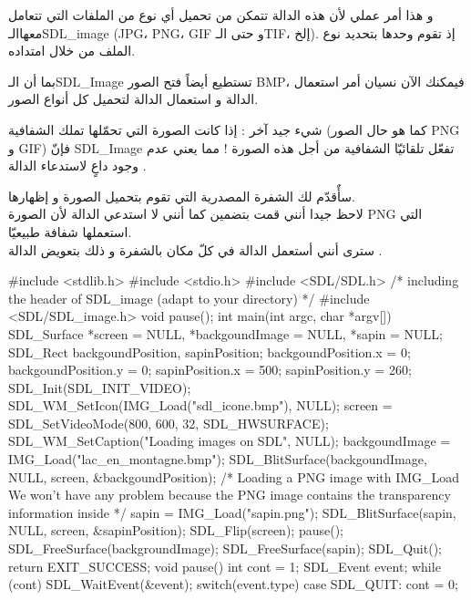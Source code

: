 و هذا أمر عملي لأن هذه الدالة تتمكن من تحميل أي نوع من الملفات التي تتعامل معهاالـ\textenglish{SDL\_image}
(\textenglish{JPG}، \textenglish{PNG}، \textenglish{GIF}
و حتى الـ\textenglish{TIF}،
إلخ). إذ تقوم وحدها بتحديد نوع الملف من خلال امتداده.
\begin{question}
بما أن الـ\textenglish{SDL\_Image}
تستطيع أيضاً فتح الصور 
\textenglish{BMP}،
فيمكنك الآن نسيان أمر استعمال الدالة 
و استعمال الدالة 
لتحميل كل أنواع الصور.
\end{question}

شيء جيد آخر : إذا كانت الصورة التي تحمّلها تملك الشفافية (كما هو حال الصور 
\textenglish{PNG}
و
\textenglish{GIF})
 فإنّ
\textenglish{SDL\_Image}
تفعّل تلقائيّا الشفافية من أجل هذه الصورة ! مما يعني عدم وجود داعٍ لاستدعاء الدالة 
.

سأٌقدّم لك الشفرة المصدرية التي تقوم بتحميل الصورة 
و إظهارها.\\
لاحظ جيدا أنني قمت بتضمين
كما أنني لا استدعي الدالة 
لأن الصورة
\textenglish{PNG}
التي استعملها شفافة طبيعيّا.\\
سترى أنني أستعمل الدالة 
في كلّ مكان بالشفرة و ذلك بتعويض الدالة 
.

\begin{Csource}
#include <stdlib.h>
#include <stdio.h>
#include <SDL/SDL.h>
/* including the header of SDL_image (adapt to your directory) */
#include <SDL/SDL_image.h> 
void pause();
int main(int argc, char *argv[])
{
	SDL_Surface *screen = NULL, *backgoundImage = NULL, *sapin = NULL;
	SDL_Rect backgoundPosition, sapinPosition;
	backgoundPosition.x = 0;
	backgoundPosition.y = 0;
	sapinPosition.x = 500;
	sapinPosition.y = 260;
	SDL_Init(SDL_INIT_VIDEO);
	SDL_WM_SetIcon(IMG_Load("sdl_icone.bmp"), NULL);
	screen = SDL_SetVideoMode(800, 600, 32, SDL_HWSURFACE);
	SDL_WM_SetCaption("Loading images on SDL", NULL);
	backgoundImage = IMG_Load("lac_en_montagne.bmp");
	SDL_BlitSurface(backgoundImage, NULL, screen, &backgoundPosition);
	/* Loading a PNG image with IMG_Load
	We won't have any problem because the PNG image contains the transparency information inside */
	sapin = IMG_Load("sapin.png");
	SDL_BlitSurface(sapin, NULL, screen, &sapinPosition); 
	SDL_Flip(screen);
	pause();
	SDL_FreeSurface(backgroundImage);
	SDL_FreeSurface(sapin);
	SDL_Quit();
	return EXIT_SUCCESS;
} 
void pause()
{
	int cont = 1;
	SDL_Event event;
	while (cont)
	{
		SDL_WaitEvent(&event);
		switch(event.type)
		{
			case SDL_QUIT:
			cont = 0;
		}
	}
}
\end{Csource}

